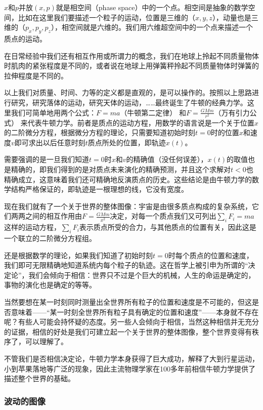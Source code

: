 $x$和$p$并放$(x, p)$就是相空间（phase space）中的一个点。相空间是抽象的数学空间，比如在这里我们要描述一个粒子的运动，位置是三维的（$x, y, z$），动量也是三维的（$p_x, p_y, p_z$），相空间就是六维的。我们用六维超空间中的一个点来描述一个质点的运动。

在日常经验中我们还有相互作用或所谓力的概念，我们在地球上拎起不同质量物体时肌肉的紧张程度是不同的，或者说在地球上用弹簧秤拎起不同质量物体时弹簧的拉伸程度是不同的。

以上我们对质量、时间、力等的定义都是直观的，是可以操作的。按照以上思路进行研究，研究落体的运动，研究天体的运动，……最终诞生了牛顿的经典力学。这里我们可简单地用两个公式：$F=ma$（牛顿第二定律）
和$F = \frac{GMm}{r^2}$（万有引力公式）
来代表牛顿力学。前者是质点的运动方程，用数学的语言说是一个关于位置$x$的二阶微分方程，根据微分方程的理论，只需要知道初始时刻$t=0$时的位置$x$和速度$v$即可求出以后任意时刻$t$质点所处的位置，即轨迹$x(t)$。

需要强调的是一旦我们知道$t=0$时$x$和$v$的精确值（没任何误差），$x(t)$的取值也是精确的，即我们得到的是对质点未来演化的精确预测，并且这个求解对$t < 0$也精确成立，这意味着我们还可精确地反演质点的历史。这些结论是由牛顿力学的数学结构严格保证的，即轨迹是一根理想的线，它没有宽度。

现在我们就有了一个关于世界的整体图像：宇宙是由很多质点构成的复杂系统，它们两两之间的相互作用由$F=\frac{GMm}{x^2}$决定，对每一个质点我们又可列出$\sum\limits_i F_i = ma$这样的运动方程，$\sum\limits_i
F_i$表示质点所受的合力，与其他质点的位置有关，因此这是一个联立的二阶微分方程组。

还是根据数学的理论，如果我们知道了初始时刻$t=0$时每个质点的位置和速度，我们即可无限精确地知道系统内每个粒子的轨迹。这在哲学上被引申为所谓的“决定论”，我们会倾向于相信：世界只不过是个巨大的机械，人生的命运是确定的，事物的演化也是确定的等等。

当然要想在某一时刻同时测量出全世界所有粒子的位置和速度是不可能的，但这是否意味着——“某一时刻全世界所有粒子具有确定的位置和速度”——本身就不存在呢？有些人可能会持怀疑的态度。另一些人会倾向于相信，当然这种相信并无充分的证据，相信的好处是我们可建立起一个关于世界的整体图像，整个世界变得有秩序了，可以理解了。

不管我们是否相信决定论，牛顿力学本身获得了巨大成功，解释了大到行星运动，小到苹果落地等广泛的现象，因此主流物理学家在100多年前相信牛顿力学提供了描述整个世界的基础。

\subsubsection{波动的图像}


